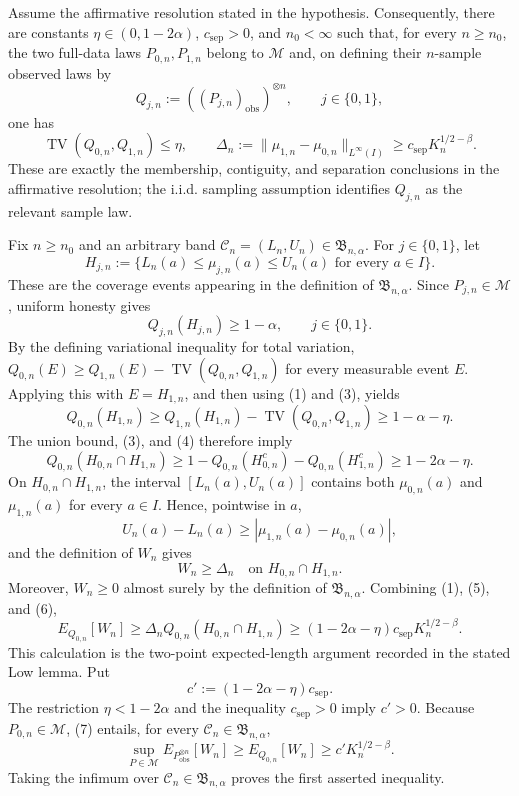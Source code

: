 Assume the affirmative resolution stated in the hypothesis.  Consequently, there are constants \(\eta\in(0,1-2\alpha)\), \(c_{\mathrm{sep}}>0\), and \(n_0<\infty\) such that, for every \(n\ge n_0\), the two full-data laws \(P_{0,n},P_{1,n}\) belong to \(\mathcal M\) and, on defining their \(n\)-sample observed laws by
\[
Q_{j,n}:=((P_{j,n})_{\mathrm{obs}})^{\otimes n},\qquad j\in\{0,1\},
\]
one has
\[
\operatorname{TV}(Q_{0,n},Q_{1,n})\le \eta,
\qquad
\Delta_n:=\|\mu_{1,n}-\mu_{0,n}\|_{L^\infty(I)}
\ge c_{\mathrm{sep}}K_n^{1/2-\beta}.
\tag{1}
\]
These are exactly the membership, contiguity, and separation conclusions in the affirmative resolution; the i.i.d. sampling assumption identifies \(Q_{j,n}\) as the relevant sample law.

Fix \(n\ge n_0\) and an arbitrary band \(\mathcal C_n=(L_n,U_n)\in\mathfrak B_{n,\alpha}\).  For \(j\in\{0,1\}\), let
\[
H_{j,n}:=\bigl\{L_n(a)\le \mu_{j,n}(a)\le U_n(a)
                  \text{ for every }a\in I\bigr\}.
\tag{2}
\]
These are the coverage events appearing in the definition of \(\mathfrak B_{n,\alpha}\).  Since \(P_{j,n}\in\mathcal M\), uniform honesty gives
\[
Q_{j,n}(H_{j,n})\ge 1-\alpha,
\qquad j\in\{0,1\}.
\tag{3}
\]
By the defining variational inequality for total variation, \(Q_{0,n}(E)\ge Q_{1,n}(E)-\operatorname{TV}(Q_{0,n},Q_{1,n})\) for every measurable event \(E\).  Applying this with \(E=H_{1,n}\), and then using (1) and (3), yields
\[
Q_{0,n}(H_{1,n})
\ge Q_{1,n}(H_{1,n})-\operatorname{TV}(Q_{0,n},Q_{1,n})
\ge 1-\alpha-\eta.
\tag{4}
\]
The union bound, (3), and (4) therefore imply
\[
Q_{0,n}(H_{0,n}\cap H_{1,n})
\ge 1-Q_{0,n}(H_{0,n}^{c})-Q_{0,n}(H_{1,n}^{c})
\ge 1-2\alpha-\eta.
\tag{5}
\]
On \(H_{0,n}\cap H_{1,n}\), the interval \([L_n(a),U_n(a)]\) contains both \(\mu_{0,n}(a)\) and \(\mu_{1,n}(a)\) for every \(a\in I\).  Hence, pointwise in \(a\),
\[
U_n(a)-L_n(a)\ge |\mu_{1,n}(a)-\mu_{0,n}(a)|,
\]
and the definition of \(W_n\) gives
\[
W_n\ge \Delta_n
\quad\text{on }H_{0,n}\cap H_{1,n}.
\tag{6}
\]
Moreover, \(W_n\ge0\) almost surely by the definition of \(\mathfrak B_{n,\alpha}\).  Combining (1), (5), and (6),
\[
E_{Q_{0,n}}[W_n]
\ge \Delta_n Q_{0,n}(H_{0,n}\cap H_{1,n})
\ge (1-2\alpha-\eta)c_{\mathrm{sep}}K_n^{1/2-\beta}.
\tag{7}
\]
This calculation is the two-point expected-length argument recorded in the stated Low lemma.  Put
\[
c':=(1-2\alpha-\eta)c_{\mathrm{sep}}.
\]
The restriction \(\eta<1-2\alpha\) and the inequality \(c_{\mathrm{sep}}>0\) imply \(c'>0\).  Because \(P_{0,n}\in\mathcal M\), (7) entails, for every \(\mathcal C_n\in\mathfrak B_{n,\alpha}\),
\[
\sup_{P\in\mathcal M}E_{P_{\mathrm{obs}}^{\otimes n}}[W_n]
\ge E_{Q_{0,n}}[W_n]
\ge c'K_n^{1/2-\beta}.
\]
Taking the infimum over \(\mathcal C_n\in\mathfrak B_{n,\alpha}\) proves the first asserted inequality.

